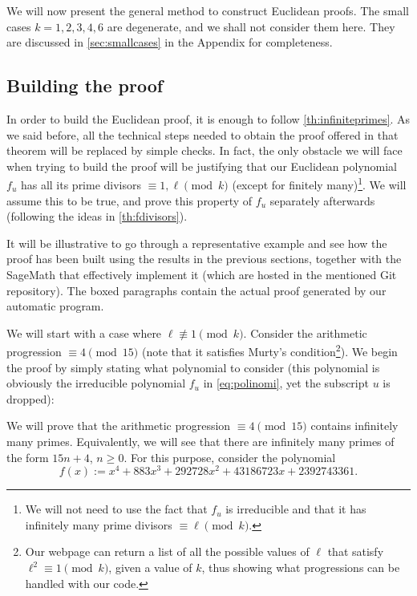 \documentclass[../main.tex]{subfiles}
\begin{document}
We will now present the general method to construct Euclidean proofs. The small cases $k=1,2,3,4,6$ are degenerate, and we shall not consider them here. They are discussed in \cref{sec:smallcases} in the Appendix for completeness.

\subsection{Building the proof}\label{sec:generalproof}

In order to build the Euclidean proof, it is enough to follow \cref{th:infiniteprimes}. As we said before, all the technical steps needed to obtain the proof offered in that theorem will be replaced by simple checks. In fact, the only obstacle we will face when trying to build the proof will be justifying that our Euclidean polynomial $f_u$ has all its prime divisors $\equiv 1,\ell \pmod{k}$ (except for finitely many)\footnote{We will not need to use the fact that $f_u$ is irreducible and that it has infinitely many prime divisors $\equiv\ell\pmod{k}$.}. We will assume this to be true, and prove this property of $f_u$ separately afterwards (following the ideas in \cref{th:fdivisors}). 

It will be illustrative to go through a representative example and see how the proof has been built using the results in the previous sections, together with the SageMath  \textcolor{blue}{} that effectively implement it (which are hosted in the mentioned Git repository). The boxed paragraphs contain the actual proof generated by our automatic program.

We will start with a case where $\ell\not\equiv 1 \pmod{k}$. Consider the arithmetic progression $\equiv 4\pmod{15}$ (note that it satisfies Murty's condition\footnote{Our webpage can return a list of all the possible values of $\ell$ that satisfy $\ell^2\equiv 1\pmod{k}$, given a value of $k$, thus showing what progressions can be handled with our code.}). We begin the proof by simply stating what polynomial to consider (this polynomial is obviously the irreducible polynomial $f_u$ in \cref{eq:polinomi}, yet the subscript $u$ is dropped):\\

\begin{mdframed}\small
	We will prove that the arithmetic progression $\equiv 4 \pmod{15}$ contains infinitely many primes. Equivalently, we will see that there are infinitely many primes of the form $15n+4$, $n\geqslant0$. For this purpose, consider the polynomial
	\begin{equation*}
		f(x):=x^{4} + 883 x^{3} + 292728 x^{2} + 43186723 x + 2392743361.
	\end{equation*}
\end{mdframed}
\end{document}
